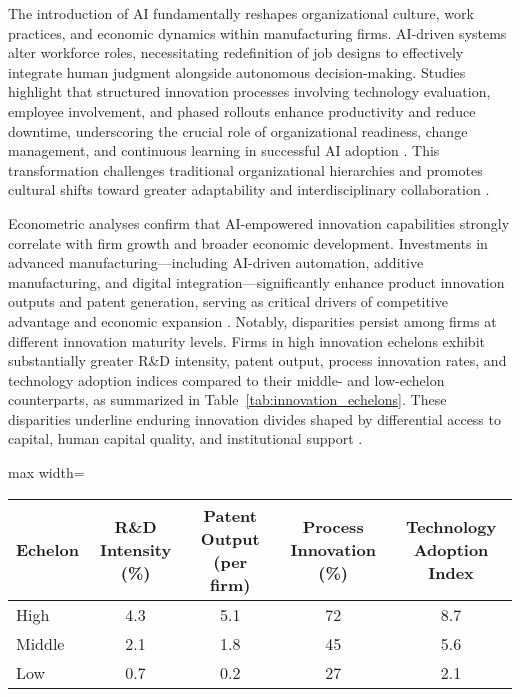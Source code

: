 \documentclass[sigconf]{acmart}
\begin{document}
The introduction of AI fundamentally reshapes organizational culture, work practices, and economic dynamics within manufacturing firms. AI-driven systems alter workforce roles, necessitating redefinition of job designs to effectively integrate human judgment alongside autonomous decision-making. Studies highlight that structured innovation processes involving technology evaluation, employee involvement, and phased rollouts enhance productivity and reduce downtime, underscoring the crucial role of organizational readiness, change management, and continuous learning in successful AI adoption \cite{ref19,ref28}. This transformation challenges traditional organizational hierarchies and promotes cultural shifts toward greater adaptability and interdisciplinary collaboration \cite{ref20,ref28}.

Econometric analyses confirm that AI-empowered innovation capabilities strongly correlate with firm growth and broader economic development. Investments in advanced manufacturing—including AI-driven automation, additive manufacturing, and digital integration—significantly enhance product innovation outputs and patent generation, serving as critical drivers of competitive advantage and economic expansion \cite{ref21,ref20}. Notably, disparities persist among firms at different innovation maturity levels. Firms in high innovation echelons exhibit substantially greater R\&D intensity, patent output, process innovation rates, and technology adoption indices compared to their middle- and low-echelon counterparts, as summarized in Table~\ref{tab:innovation_echelons}. These disparities underline enduring innovation divides shaped by differential access to capital, human capital quality, and institutional support \cite{ref21}.

\begin{table*}[htbp]
\centering
\caption{Innovation Activity Indicators Across Development Echelons in Manufacturing Industries \cite{ref21}}
\label{tab:innovation_echelons}
\begin{adjustbox}{max width=\textwidth}
\begin{tabular}{@{}lcccc@{}}
\toprule
Echelon & R\&D Intensity (\%) & Patent Output (per firm) & Process Innovation (\%) & Technology Adoption Index \\ \midrule
High & 4.3 & 5.1 & 72 & 8.7 \\
Middle & 2.1 & 1.8 & 45 & 5.6 \\
Low & 0.7 & 0.2 & 27 & 2.1 \\
\bottomrule
\end{tabular}
\end{adjustbox}
\end{table*}
\end{document}
